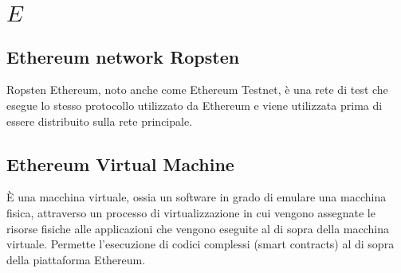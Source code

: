 \section{\quad$E\quad$}
\subsection{Ethereum network Ropsten}
Ropsten Ethereum, noto anche come Ethereum Testnet, è una rete di test che esegue lo stesso protocollo utilizzato da Ethereum e viene utilizzata prima di essere distribuito sulla rete principale.


\subsection{Ethereum Virtual Machine}
È una macchina virtuale, ossia un software in grado di emulare una macchina fisica, attraverso un processo di virtualizzazione in cui vengono assegnate le risorse fisiche alle applicazioni che vengono eseguite al di sopra della macchina virtuale. Permette l’esecuzione di codici complessi (smart contracts) al di sopra della piattaforma Ethereum.


